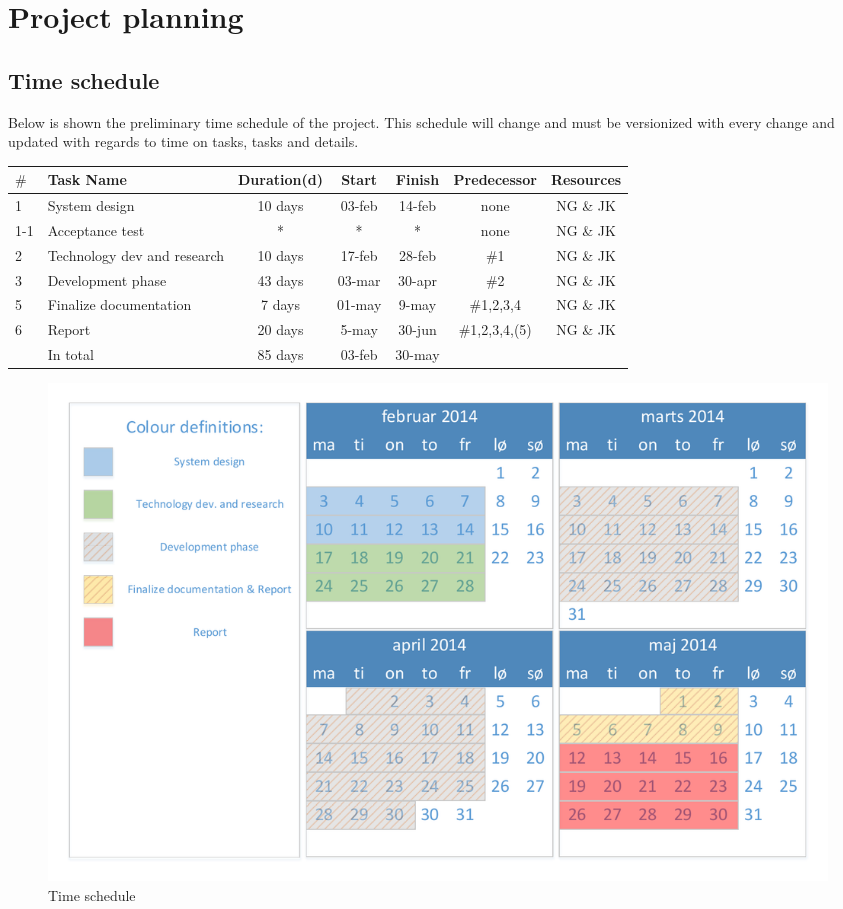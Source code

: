 \chapter{Project planning}
\section{Time schedule}
Below is shown the preliminary time schedule of the project. This schedule will change and must be versionized with every change and updated with regards to time on tasks, tasks and details.\\ 

\begin{table}[H]
\centering
\begin{tabular}{|l |p{4cm} |c |c |c |c |c|}
\hline 
$\#$ & Task Name & Duration(d) & Start & Finish & Predecessor & Resources \\ 
\hline 
1 & System design & 10 days & 03-feb & 14-feb & none & NG \& JK \\ 
\hline
1-1 & Acceptance test & * & * & * & none &  NG \& JK \\ 
\hline
2 & Technology dev and research & 10 days & 17-feb & 28-feb & $\#$1 & NG \& JK \\ 
\hline 
3 & Development phase & 43 days & 03-mar & 30-apr & $\#$2 & NG \& JK \\ 
\hline 
5 & Finalize documentation & 7 days & 01-may & 9-may & $\#$1,2,3,4 & NG \& JK \\ 
\hline 
6 & Report & 20 days & 5-may & 30-jun & $\#$1,2,3,4,(5) & NG \& JK \\ 
\hline \hline
~ & In total & 85 days & 03-feb & 30-may & ~ & ~ \\ 
\hline 
\end{tabular} 
\end{table}

\begin{figure}[H]
\centering
\includegraphics[width=.9\textwidth]{billeder/timeschedule_vector}
\caption{Time schedule}
\end{figure}


